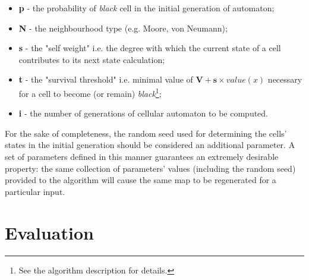 \documentclass[a4paper, 11pt]{article} %
\begin{document}
\begin{itemize}
	\item \textbf{p} - the probability of \emph{black} cell in the initial generation of automaton;
	\item \textbf{N} - the neighbourhood type (e.g. Moore, von Neumann);
	\item \textbf{s} - the "self weight" i.e. the degree with which the current state of a cell contributes to its next state calculation;
	\item \textbf{t} - the "survival threshold" i.e. minimal value of $\textbf{V} + \textbf{s} \times value(x)$  necessary for a cell to become (or remain) \emph{black}\footnote{See the algorithm description for details.};
	\item \textbf{i} - the number of generations of cellular automaton to be computed.
\end{itemize}

For the sake of completeness, the random seed used for determining the cells' states in the initial generation should be considered an additional parameter. A set of parameters defined in this manner guarantees an extremely desirable property: the same collection of parameters' values (including the random seed) provided to the algorithm will cause the same map to be regenerated for a particular input.



\section*{Evaluation}
\end{document}
